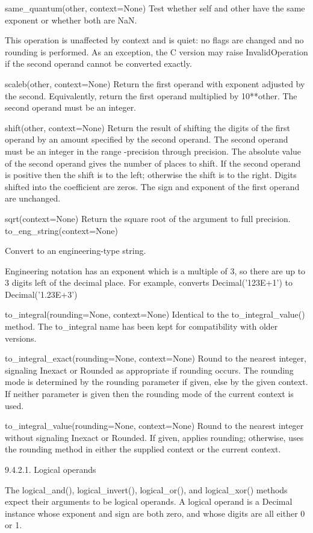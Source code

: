 same\_quantum(other, context=None)
Test whether self and other have the same exponent or whether both are NaN.

This operation is unaffected by context and is quiet: no flags are changed and no rounding is performed. As an exception, the C version may raise InvalidOperation if the second operand cannot be converted exactly.

scaleb(other, context=None)
Return the first operand with exponent adjusted by the second. Equivalently, return the first operand multiplied by 10**other. The second operand must be an integer.

shift(other, context=None)
Return the result of shifting the digits of the first operand by an amount specified by the second operand. The second operand must be an integer in the range -precision through precision. The absolute value of the second operand gives the number of places to shift. If the second operand is positive then the shift is to the left; otherwise the shift is to the right. Digits shifted into the coefficient are zeros. The sign and exponent of the first operand are unchanged.

sqrt(context=None)
Return the square root of the argument to full precision.
to\_eng\_string(context=None)

Convert to an engineering-type string.

Engineering notation has an exponent which is a multiple of 3, so there are up to 3 digits left of the decimal place. For example, converts Decimal('123E+1') to Decimal('1.23E+3')

to\_integral(rounding=None, context=None)
Identical to the to\_integral\_value() method. The to\_integral name has been kept for compatibility with older versions.

to\_integral\_exact(rounding=None, context=None)
Round to the nearest integer, signaling Inexact or Rounded as appropriate if rounding occurs. The rounding mode is determined by the rounding parameter if given, else by the given context. If neither parameter is given then the rounding mode of the current context is used.

to\_integral\_value(rounding=None, context=None)
Round to the nearest integer without signaling Inexact or Rounded. If given, applies rounding; otherwise, uses the rounding method in either the supplied context or the current context.


9.4.2.1. Logical operands

The logical\_and(), logical\_invert(), logical\_or(), and logical\_xor() methods expect their arguments to be logical operands. A logical operand is a Decimal instance whose exponent and sign are both zero, and whose digits are all either 0 or 1.


